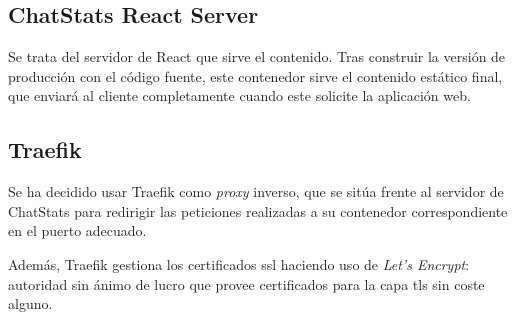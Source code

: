 \subsection{ChatStats React Server}

Se trata del servidor de React que sirve el contenido. Tras construir la versión de producción con el código fuente, este contenedor sirve el contenido estático final, que enviará al cliente completamente cuando este solicite la aplicación web.

\subsection{Traefik}

Se ha decidido usar Traefik como \textit{proxy} inverso, que se sitúa frente al servidor de ChatStats para redirigir las peticiones realizadas a su contenedor correspondiente en el puerto adecuado.

Además, Traefik gestiona los certificados \acrshort{ssl} haciendo uso de \textit{Let's Encrypt}: autoridad sin ánimo de lucro que provee certificados para la capa \acrshort{tls} sin coste alguno.



\newpage
